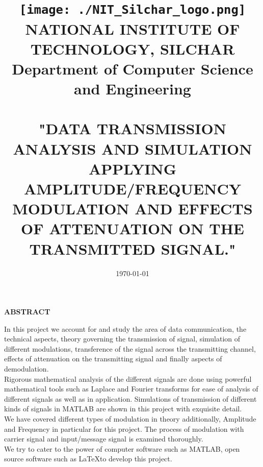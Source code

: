 \documentclass[12pt,a4paper]{article}%
\begin{document}
	
	
	\begin{titlepage}
	\title{\texttt{[image: ./NIT\_Silchar\_logo.png]}\\\textbf{\large NATIONAL INSTITUTE OF TECHNOLOGY, SILCHAR}\\\textbf{{\large Department of Computer Science and Engineering}}\\\\\bigskip\textbf{{\normalsize "DATA TRANSMISSION ANALYSIS AND SIMULATION APPLYING AMPLITUDE/FREQUENCY MODULATION AND EFFECTS OF ATTENUATION ON THE TRANSMITTED SIGNAL." }}}
	\date{\today}
	\clearpage\maketitle
	\thispagestyle{empty}
	\end{titlepage}
	
	\begin{center}
		\textbf{\large ABSTRACT}
	\end{center}
    \begin{flushleft}
    	\fontsize{12pt}{18pt}\selectfont
    	 In this project we account for and study the area of data communication, the technical aspects, theory governing the transmission of signal, simulation of different modulations, transference of the signal across the transmitting channel, effects of attenuation on the transmitting signal and finally aspects of demodulation.\\\bigskip
    	 Rigorous mathematical analysis of the different signals are done using powerful mathematical tools such as Laplace and Fourier transforms for ease of analysis of
    	 different signals as well as in application. Simulations of transmission of different kinds of signals in MATLAB are shown in this project with exquisite detail.\\\bigskip
    	 We have covered different types of modulation in theory additionally, Amplitude and Frequency in particular for this project. The process of modulation with carrier signal
    	 and input/message signal is examined thoroughly.\\\bigskip
    	 We try to cater to the power of computer software such as MATLAB, open source software such as \LaTeX to develop this project.
	\end{flushleft}
	
\end{document}
